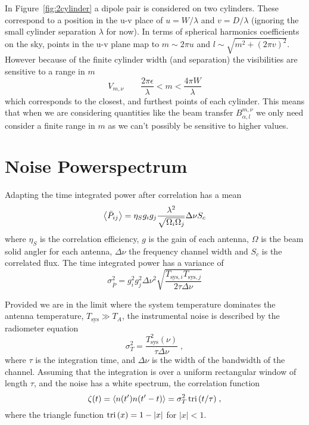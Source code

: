 \documentclass[prd,twocolumn,nofootinbib]{revtex4}
\begin{document}
In Figure~\ref{fig:2cylinder} a dipole pair is considered on two
cylinders. These correspond to a position in the u-v place of $u = W / \lambda$
and $v = D / \lambda$ (ignoring the small cylinder separation $\lambda$ for
now). In terms of spherical harmonics coefficients on the sky, points in the u-v
plane map to $m \sim 2\pi u$ and $l \sim \sqrt{m^2 + (2\pi v)^2}$. However
because of the finite cylinder width (and separation) the visibilities are
sensitive to a range in $m$
\begin{equation}
  V_{m,\nu} \qquad \frac{2 \pi \epsilon}{\lambda} < m < \frac{4 \pi
    W}{\lambda}
\end{equation}
which corresponds to the closest, and furthest points of each cylinder. This
means that when we are considering quantities like the beam transfer
$B_{\alpha,l}^{m,\nu}$ we only need consider a finite range in $m$ as we can't
possibly be sensitive to higher values.

\appendix


\section{Noise Powerspectrum}


\cite{corbella:2004}

Adapting \cite{wrobel:1999} the time integrated power after
correlation has a mean
\begin{equation}
\left\langle \bar{P}_{ij} \right\rangle= \eta_S g_i g_j \frac{\lambda^2}{\sqrt{\Omega_i \Omega_j}}
\Delta\nu S_c
\end{equation}
where $\eta_S$ is the correlation efficiency, $g$ is the gain of each antenna,
$\Omega$ is the beam solid angler for each antenna, $\Delta\nu$ the frequency
channel width and $S_c$ is the correlated flux. The time integrated power has a
variance of
\begin{equation}
\sigma_{\bar{P}}^2 = g_i^2 g_j^2 \Delta\nu^2 \sqrt{\frac{T_{\text{sys},i}
    T_{\text{sys},j}}{2 \tau \Delta\nu}}
\end{equation}

Provided we are in the limit where the system temperature dominates the antenna
temperature, $T_\text{sys} \gg T_A$, the instrumental noise is described by the
radiometer equation
\begin{equation}
\sigma_T^2 = \frac{T_\text{sys}^2(\nu)}{\tau \Delta\nu} \; ,
\end{equation}
where $\tau$ is the integration time, and $\Delta\nu$ is the width of the
bandwidth of the channel. Assuming that the integration is over a uniform
rectangular window of length $\tau$, and the noise has a white spectrum, the
correlation function
\begin{equation}
\zeta(t) = \left\langle n(t') n(t' - t) \right\rangle = \sigma_T^2 \operatorname{tri}{(t / \tau)} \; ,
\end{equation}
where the triangle function $\operatorname{tri}{(x)} = 1 - \left\lvert x \right\rvert$ for
$\left\lvert x \right\rvert < 1$.
\end{document}
